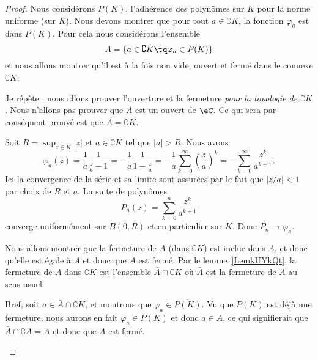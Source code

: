 \begin{proof}
	Nous considérons \( P(K)\), l'adhérence des polynômes sur \( K\) pour la norme uniforme (sur \( K\)). Nous devons montrer que pour tout \( a\in \complement K\), la fonction \( \varphi_a\) est dans \( P(K)\). Pour cela nous considérons l'ensemble
	\begin{equation}
		A=\{ a\in\complement K\tq \varphi_a\in P(K) \}
	\end{equation}
	et nous allons montrer qu'il est à la fois non vide, ouvert et fermé dans le connexe \( \complement K\).

	Je répète : nous allons prouver l'ouverture et la fermeture \emph{pour la topologie de \( \complement K\)}. Nous n'allons pas prouver que \( A\) est un ouvert de \( \eC\). Ce qui sera par conséquent prouvé est que \( A=\complement K\).

	\begin{subproof}
		 Soit \( R=\sup_{z\in K}| z |\) et \( a\in \complement K\) tel que \( | a |>R\). Nous avons
		\begin{equation}
			\varphi_a(z)=\frac{1}{ a }\frac{1}{ \frac{ z }{ a }-1 }
			=-\frac{1}{ a }\frac{1}{ 1-\frac{ z }{ a } }
			=-\frac{1}{ a }\sum_{k=0}^{\infty}\left( \frac{ z }{ a } \right)^k
			=-\sum_{k=0}^{\infty}\frac{ z^k }{ a^{k+1} }.
		\end{equation}
		Ici la convergence de la série et sa limite sont assurées par le fait que \( | z/a |<1\) par choix de \( R\) et \( a\). La suite de polynômes
		\begin{equation}
			P_n(z)=\sum_{k=0}^n\frac{ z^k }{ a^{k+1} }
		\end{equation}
		converge uniformément sur \( B(0,R)\) et en particulier sur \( K\). Donc \( P_n\to \varphi_a\).

		\spitem[Fermé]

		Nous allons montrer que la fermeture de \( A\) (dans \( \complement K\)) est inclue dans \( A\), et donc qu'elle est égale à \( A\) et donc que \( A\) est fermé. Par le lemme~\ref{LemkUYkQt}, la fermeture de \( A\) dans \( \complement K\) est l'ensemble \( \bar A\cap\complement K\) où \( \bar A\) est la fermeture de \( A\) au sens usuel.

		Bref, soit \( a\in \bar A\cap\complement K\), et montrons que \( \varphi_a\in \overline{ P(K) }\). Vu que \( P(K)\) est déjà une fermeture, nous aurons en fait \( \varphi_a\in P(K)\) et donc \( a\in A\), ce qui signifierait que \( \bar A\cap\complement A=A\) et donc que \( A\) est fermé.


\end{subproof}
\end{proof}
